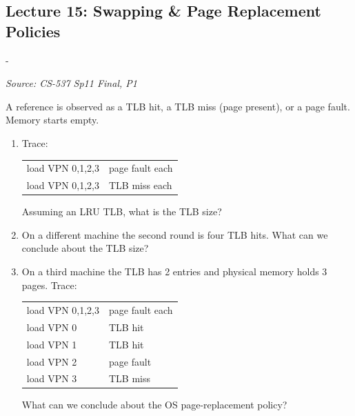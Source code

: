 \documentclass[11pt,a4paper]{article}
\makeatletter
\newcommand{\keepspace}[1]{\par\penalty-100\begingroup
  \setlength{\dimen@}{#1}\dimen@ii\pagegoal\advance\dimen@ii-\pagetotal
  \ifdim\dimen@>\dimen@ii\ifdim\dimen@ii>\z@\vfil\fi\break\fi\endgroup}
\newcounter{qn}[section]
\newenvironment{Qn}[4]{%
  \refstepcounter{qn}\keepspace{7\baselineskip}%
  \begin{tcolorbox}[qboxstyle, title={Q\thesection.\theqn\ \ [#1 \textbar\ #2]\ \ #4}]%
  {\footnotesize\color{g3}\textit{Source: #3}}\par\smallskip%
}{%
  \end{tcolorbox}%
}
\makeatother
\begin{document}
\subsection{Lecture 15: Swapping \& Page Replacement Policies}

\begin{Qn}{Hard}{Lect 15}{CS-537 Sp11 Final, P1}{Black-box VM: infer TLB size and the OS replacement policy}
A reference is observed as a TLB hit, a TLB miss (page present), or a
page fault. Memory starts empty.
\begin{enumerate}
  \item[(a)] Trace:
  \begin{center}
  \begin{tabular}{ll}
    load VPN 0,1,2,3 & page fault each \\
    load VPN 0,1,2,3 & TLB miss each
  \end{tabular}
  \end{center}
  Assuming an LRU TLB, what is the TLB size?
  \item[(b)] On a different machine the second round is four TLB hits.
        What can we conclude about the TLB size?
  \item[(c)] On a third machine the TLB has 2 entries and physical memory
        holds 3 pages. Trace:
  \begin{center}
  \begin{tabular}{ll}
    load VPN 0,1,2,3 & page fault each \\
    load VPN 0        & TLB hit \\
    load VPN 1        & TLB hit \\
    load VPN 2        & page fault \\
    load VPN 3        & TLB miss
  \end{tabular}
  \end{center}
  What can we conclude about the OS page-replacement policy?
\end{enumerate}
\end{Qn}
\end{document}
